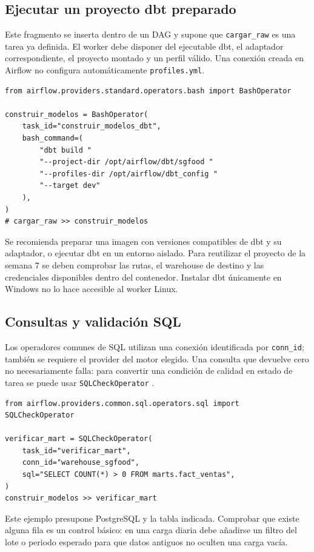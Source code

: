 \documentclass[12pt]{article}
\begin{document}
\subsection{Ejecutar un proyecto dbt preparado}
Este fragmento se inserta dentro de un DAG y supone que \texttt{cargar\_raw} es una tarea ya definida. El worker debe disponer del ejecutable dbt, el adaptador correspondiente, el proyecto montado y un perfil válido. Una conexión creada en Airflow no configura automáticamente \texttt{profiles.yml}.
\begin{lstlisting}[style=python,caption={Integración ilustrativa con dbt Core}]
from airflow.providers.standard.operators.bash import BashOperator

construir_modelos = BashOperator(
    task_id="construir_modelos_dbt",
    bash_command=(
        "dbt build "
        "--project-dir /opt/airflow/dbt/sgfood "
        "--profiles-dir /opt/airflow/dbt_config "
        "--target dev"
    ),
)
# cargar_raw >> construir_modelos
\end{lstlisting}
Se recomienda preparar una imagen con versiones compatibles de dbt y su adaptador, o ejecutar dbt en un entorno aislado. Para reutilizar el proyecto de la semana 7 se deben comprobar las rutas, el warehouse de destino y las credenciales disponibles dentro del contenedor. Instalar dbt únicamente en Windows no lo hace accesible al worker Linux.

\subsection{Consultas y validación SQL}
Los operadores comunes de SQL utilizan una conexión identificada por \texttt{conn\_id}; también se requiere el provider del motor elegido. Una consulta que devuelve cero no necesariamente falla: para convertir una condición de calidad en estado de tarea se puede usar \texttt{SQLCheckOperator} \cite{airflow_sql}.
\begin{lstlisting}[style=python]
from airflow.providers.common.sql.operators.sql import SQLCheckOperator

verificar_mart = SQLCheckOperator(
    task_id="verificar_mart",
    conn_id="warehouse_sgfood",
    sql="SELECT COUNT(*) > 0 FROM marts.fact_ventas",
)
construir_modelos >> verificar_mart
\end{lstlisting}
Este ejemplo presupone PostgreSQL y la tabla indicada. Comprobar que existe alguna fila es un control básico: en una carga diaria debe añadirse un filtro del lote o periodo esperado para que datos antiguos no oculten una carga vacía.
\end{document}
